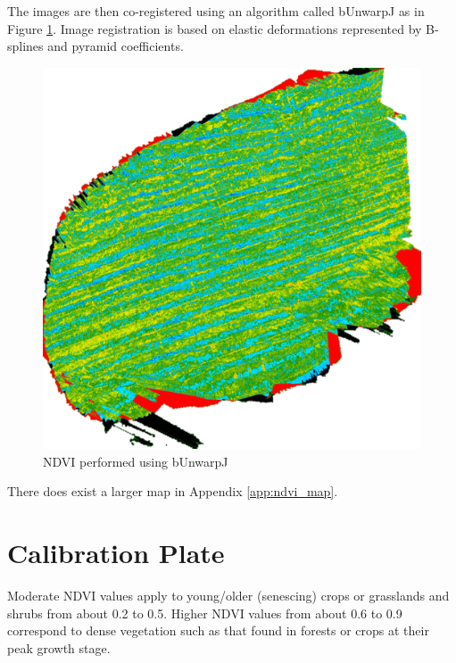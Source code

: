 The images are then co-registered using an algorithm called bUnwarpJ \cite{bunwarpj} as in Figure \ref{fig:stitch_map}. Image registration is based on elastic deformations represented by B-splines and pyramid coefficients. 

\begin{figure}[H]
\centering
\includegraphics[scale=0.35]{images/map_ndvi.png}
\caption{NDVI performed using bUnwarpJ}
\label{fig:stitch_map}
\end{figure}

There does exist a larger map in Appendix \ref{app:ndvi_map}.


\section{Calibration Plate}
\label{sec:cal_plate}

Moderate NDVI values apply to young/older (senescing) crops or grasslands and shrubs from about 0.2 to 0.5. Higher NDVI values from about 0.6 to 0.9 correspond to dense vegetation such as that found in forests or crops at their peak growth stage. \cite{ndvi_values}\\

